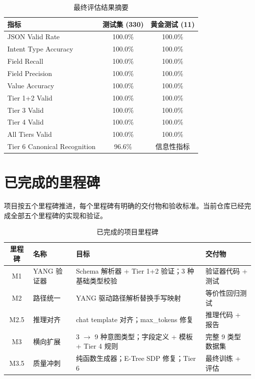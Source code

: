 \documentclass[12pt, a4paper]{article}
\begin{document}
\begin{table}[H]
\centering
\caption{最终评估结果摘要}
\label{tab:final-metrics}
\small
\begin{tabular}{lcc}
\toprule
\textbf{指标} & \textbf{测试集 (330)} & \textbf{黄金测试 (11)} \\
\midrule
JSON Valid Rate & 100.0\% & 100.0\% \\
Intent Type Accuracy & 100.0\% & 100.0\% \\
Field Recall & 100.0\% & 100.0\% \\
Field Precision & 100.0\% & 100.0\% \\
Value Accuracy & 100.0\% & 100.0\% \\
Tier 1+2 Valid & 100.0\% & 100.0\% \\
Tier 3 Valid & 100.0\% & 100.0\% \\
Tier 4 Valid & 100.0\% & 100.0\% \\
All Tiers Valid & 100.0\% & 100.0\% \\
Tier 6 Canonical Recognition & 96.6\% & 信息性指标 \\
\bottomrule
\end{tabular}
\end{table}

\section{已完成的里程碑}
\label{sec:milestones}

项目按五个里程碑推进，每个里程碑有明确的交付物和验收标准。当前仓库已经完成全部五个里程碑的实现和验证。

\begin{table}[H]
\centering
\caption{已完成的项目里程碑}
\label{tab:milestones}
\small
\begin{tabular}{clp{5.5cm}p{3.5cm}}
\toprule
\textbf{里程碑} & \textbf{名称} & \textbf{目标} & \textbf{交付物} \\
\midrule
M1 & YANG 验证器 &
  Schema 解析器 + Tier 1+2 验证；3 种基础类型校验 &
  验证器代码 + 测试 \\
\addlinespace
M2 & 路径统一 &
  YANG 驱动路径解析替换手写映射 &
  等价性回归测试 \\
\addlinespace
M2.5 & 推理对齐 &
  chat template 对齐；max\_tokens 修复 &
  推理代码 + 报告 \\
\addlinespace
M3 & 横向扩展 &
  3 $\to$ 9 种意图类型；字段定义 + 模板 + Tier 4 规则 &
  完整 9 类型数据集 \\
\addlinespace
M3.5 & 质量冲刺 &
  纯函数生成器；E-Tree SDP 修复；Tier 6 &
  最终训练 + 评估 \\
\bottomrule
\end{tabular}
\end{table}
\end{document}
